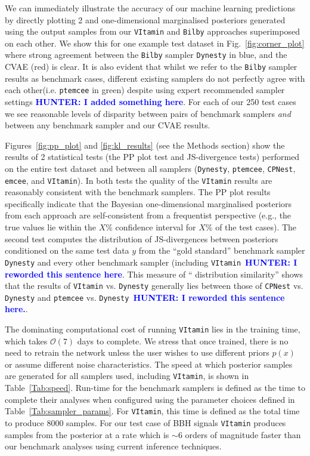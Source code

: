 \documentclass[%
showpacs,
nofootinbib,
 amsmath,amssymb,
 aps,
 twocolumn,
 prl,
 reprint,
floatfix,
]{revtex4-1}
\newcommand{\hunter}[1]{\textbf{\textcolor{blue}{HUNTER: #1}}}
\begin{document}
%
%
We can immediately illustrate the accuracy of our machine learning predictions
by directly plotting 2 and one-dimensional marginalised posteriors generated
using the output samples from our \texttt{VItamin} and \texttt{Bilby}
approaches superimposed on each other. We show this for one example test
dataset in Fig.~\ref{fig:corner_plot} where strong agreement between the
\texttt{Bilby} sampler \texttt{Dynesty} in blue,  and the
\ac{CVAE} (red) is clear. It is also evident that whilst we refer to the
\texttt{Bilby} sampler results as benchmark cases, different existing samplers
do not perfectly agree with each other(i.e. \texttt{ptemcee} in green) despite using 
expert recommended sampler settings \hunter{I added something here}.  For each of our 
250 test cases we see
reasonable levels of disparity between pairs of benchmark samplers \emph{and}
between any benchmark sampler and our \ac{CVAE} results. 

%
%
Figures~\ref{fig:pp_plot} and \ref{fig:kl_results} (see the Methods section)
show the results of 2 statistical tests (the \ac{PP} plot test and
\ac{JS}-divergence tests) performed on the entire test dataset and between all
samplers (\texttt{Dynesty}, \texttt{ptemcee}, \texttt{CPNest}, \texttt{emcee}, and \texttt{VItamin}). In
both tests the quality of the \texttt{VItamin} results are reasonably consistent with the
benchmark samplers. The \ac{PP} plot results specifically indicate that the
Bayesian one-dimensional marginalised posteriors from each approach are
self-consistent from a frequentist perspective (e.g., the true values lie
within the $X\%$ confidence interval for $X\%$ of the test cases). The second
test computes the distribution of \ac{JS}-divergences between posteriors
conditioned on the same test data $y$ from the ``gold standard'' benchmark 
sampler \texttt{Dynesty} and every other benchmark sampler (including 
\texttt{VItamin}~\hunter{I reworded this sentence here}.  This measure of ``
distribution similarity'' shows that the results of \texttt{VItamin} vs. 
\texttt{Dynesty} generally lies between those of  \texttt{CPNest} vs. 
\texttt{Dynesty} and \texttt{ptemcee} vs. \texttt{Dynesty}~\hunter{I reworded 
this sentence here.}.

%
%
The dominating computational cost of running \texttt{VItamin} lies in the
training time, which takes $\mathcal{O}(7)$ days to complete. We
stress that once trained, there is no need to retrain the network unless the
user wishes to use different priors $p(x)$ or assume different noise
characteristics. The speed at which posterior samples are generated for all
samplers used, including \texttt{VItamin}, is shown in Table~\ref{Tab:speed}.
Run-time for the benchmark samplers is defined as the time to complete their
analyses when configured using the parameter choices defined in
Table~\ref{Tab:sampler_params}. For \texttt{VItamin}, this time is defined as
the total time to produce $8000$ samples. For our test case of \ac{BBH} signals
\texttt{VItamin} produces samples from the posterior at a rate which is $\sim
6$ orders of magnitude faster than our benchmark analyses using current
inference techniques. 
\end{document}
